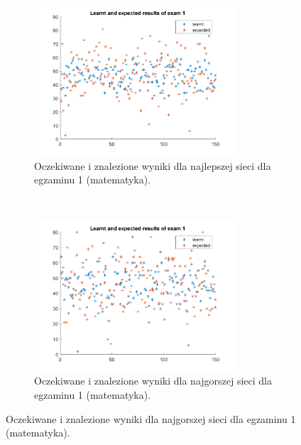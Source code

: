 \documentclass[12pt]{article}
\begin{document}
\begin{figure}[H]
\begin{subfigure}[t]{0.48\textwidth} 
\centering
\includegraphics[height=2.2in]{best_results_1.png}
\caption{Oczekiwane i znalezione wyniki dla najlepszej sieci dla egzaminu 1 (matematyka).}
\end{subfigure}
~~
\begin{subfigure}[t]{0.48\textwidth} 
\centering
\includegraphics[height=2.2in]{worst_exam_1.png}
\caption{Oczekiwane i znalezione wyniki dla najgorszej sieci dla egzaminu 1 (matematyka).}
\end{subfigure}


\end{figure}
\end{document}
